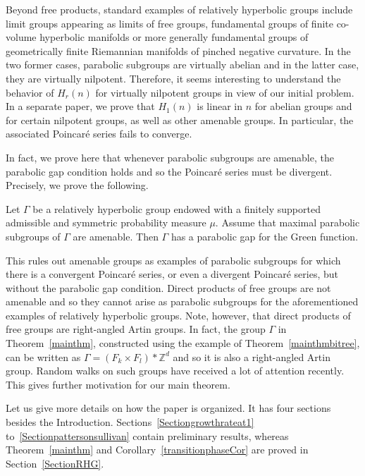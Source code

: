\documentclass[AHL,Unicode,longabstracts]{cedram}
\newcommand{\Z}{\mathbb{Z}}
\begin{document}
Beyond free products, standard examples of relatively hyperbolic groups include limit groups appearing as limits of free groups, fundamental groups of finite co-volume hyperbolic manifolds or more generally fundamental groups of geometrically finite Riemannian manifolds of pinched negative curvature. In the two former cases, parabolic subgroups are virtually abelian and in the latter case, they are virtually nilpotent. Therefore, it seems interesting to understand the behavior of $H_r(n)$ for virtually nilpotent groups in view of our initial problem. In a separate paper, we prove that $H_1(n)$ is linear in $n$ for abelian groups and for certain nilpotent groups, as well as other amenable groups. In particular, the associated Poincaré series fails to converge.

In fact, we prove here that whenever parabolic subgroups are amenable, the parabolic gap condition holds and so the Poincaré series must be divergent. Precisely, we prove the following.

\begin{theo}
\label{mainthmamenable}
Let $\Gamma$ be a relatively hyperbolic group endowed with a finitely supported admissible and symmetric probability measure $\mu$. Assume that maximal parabolic subgroups of $\Gamma$ are amenable. Then $\Gamma$ has a parabolic gap for the Green function.
\end{theo}

This rules out amenable groups as examples of parabolic subgroups for which there is a convergent Poincaré series, or even a divergent Poincaré series, but without the parabolic gap condition. {Direct} products of free groups are not amenable and so they cannot arise as parabolic subgroups for the aforementioned examples of relatively hyperbolic groups. Note, however, that {direct} products of free groups are right-angled Artin groups. In fact, the group $\Gamma$ in Theorem~\ref{mainthm}, constructed using the example of Theorem~\ref{mainthmbitree}, can be written as $\Gamma=(F_k\times F_l)*\Z^d$ and so it is also a right-angled Artin group. Random walks on such groups have received a lot of attention recently. This gives further motivation for our main theorem.



Let us give more details on how the paper is organized. It has four sections besides the Introduction. Sections~\ref{Sectiongrowthrateat1} to~\ref{Sectionpattersonsullivan} contain preliminary results, whereas Theorem~\ref{mainthm} and Corollary~\ref{transitionphaseCor} are proved in Section~\ref{SectionRHG}.
\end{document}
